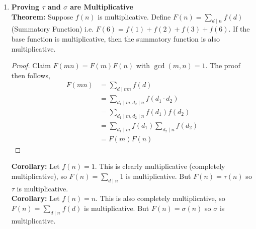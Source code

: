 \documentclass[class=article, crop=false]{standalone}
\def\inlinesum#1#2{\overset{#2}{\underset{#1}{\sum}}}
\begin{document}
\begin{enumerate}[1.]
\item \textbf{Proving $\tau$ and $\sigma$ are Multiplicative} \\
\textbf{Theorem:} Suppose $f(n)$ is multiplicative. Define $F(n) =\inlinesum{d\mid n}{}f(d)$ (Summatory Function)
i.e. $F(6) = f(1) + f(2) + f(3) + f(6)$. If the base function is multiplicative, then the summatory function is also
multiplicative.
\begin{proof}
	Claim $F(mn) = F(m)F(n)$ with $\gcd(m,n)=1$. The proof then follows,
	\begin{align*}
		F(mn) &= \sum_{d\mid mn} f(d) \\
		&= \sum_{d_1\mid m, d_2\mid n} f(d_1\cdot d_2) \\
		&= \sum_{d_1\mid m, d_2\mid n} f(d_1) f(d_2) \\
		&= \sum_{d_1\mid m} f(d_1) \sum_{d_2\mid n} f(d_2) \\
		&= F(m) F(n)
	\end{align*}
\end{proof}
\noindent\textbf{Corollary:} Let $f(n)=1$. This is clearly multiplicative (completely multiplicative),
so $F(n) = \inlinesum{d\mid n}{}1$ is multiplicative. But $F(n) = \tau(n)$ so $\tau$ is multiplicative.\\
\textbf{Corollary:} Let $f(n)=n$. This is also completely multiplicative, so $F(n) = \inlinesum{d\mid n}{}f(d)$
is multiplicative. But $F(n) = \sigma(n)$ so $\sigma$ is multiplicative.

\end{enumerate}

\end{document}
